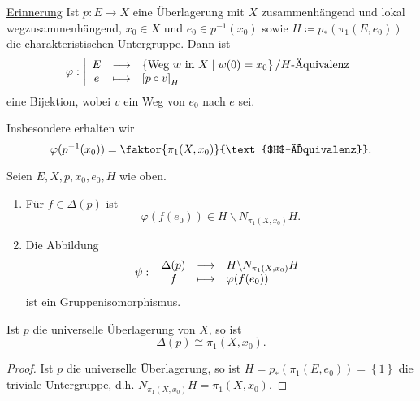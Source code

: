 \underline{Erinnerung} Ist $p\colon  E\to X$ eine Überlagerung mit $X$ zusammenhängend und lokal wegzusammenhängend,  $x_0\in X$ und $e_0\in p^{-1} (x_0)$ sowie $H\coloneqq p_*(\pi_1(E,e_0))$ die charakteristischen Untergruppe. Dann ist
    \begin{equation*}
    \varphi : \left| \begin{array}{c c l} 
        E & \longrightarrow & \left \{\text{Weg $w$ in  $X$}\mid  w(0) = x_0\right\} / \text{$H$-Äquivalenz} \\
e & \longmapsto &  \left[ p \circ  v \right] _H
    \end{array} \right.
\end{equation*}
eine Bijektion, wobei $v$ ein Weg von  $e_0$ nach $e$ sei.

Insbesondere erhalten wir
\[
    \varphi (p^{-1} (x_0)) = \faktor{\pi_1(X,x_0)}{\text{$H$-Äquivalenz}}
.\] 

\begin{theorem}\label{thm:isomorphismus-von-decktransformationen-mit-nebenklassengruppe-von-charakteristischer-untergruppe-in-seinem-normalisator}
    Seien $E,X,p,x_0,e_0,H$ wie oben.
    \begin{enumerate}[1)]
        \item Für $f\in \Delta(p)$ ist
            \[
                \varphi (f(e_0)) \in H \backslash N_{\pi_1(X,x_0)}H
            .\] 
        \item Die Abbildung
                \begin{equation*}
                \psi : \left| \begin{array}{c c l} 
                    \Delta(p) & \longrightarrow & H \backslash N_{\pi_1(X,x_0)}H \\
                    f & \longmapsto &  \varphi (f(e_0))
                \end{array} \right.
            \end{equation*}
           ist ein Gruppenisomorphismus. 
    \end{enumerate}
\end{theorem}

\begin{dcorollary}
    Ist $p$ die universelle Überlagerung von  $X$, so ist
    \[
        \Delta(p) \cong \pi_1(X,x_0)
    .\] 
\end{dcorollary}

\begin{proof}
    Ist $p$ die universelle Überlagerung, so ist  $H = p_*(\pi_1(E,e_0)) = \left \{1\right\} $ die triviale Untergruppe, d.h. $N_{\pi_1(X,x_0)}H = \pi_1(X,x_0)$.
\end{proof}

